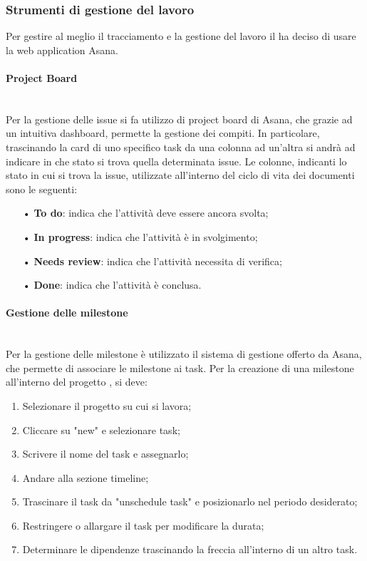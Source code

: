     \subsubsection{Strumenti di gestione del lavoro}\mbox{}
    Per gestire al meglio il tracciamento e la gestione del lavoro il \Gruppo \space ha deciso di usare la web application Asana. 

    \paragraph{Project Board}\mbox{}\\
    \label{sec:projectboard}
    Per la gestione delle {issue} si fa utilizzo di {project board} di Asana, che grazie ad un intuitiva dashboard, permette
    la gestione dei compiti. In particolare, trascinando la {card} di uno specifico task da una colonna ad un'altra si andrà ad 
    indicare in che stato si trova quella determinata issue.
    Le colonne, indicanti lo stato in cui si trova la issue, utilizzate all'interno del ciclo di vita dei 
    documenti sono le seguenti:
    \begin{itemize}
    \item[•] \textbf{To do}: indica che l'attività deve essere ancora svolta;
    \item[•] \textbf{In progress}: indica che l'attività è in svolgimento;
    \item[•] \textbf{Needs review}: indica che l'attività necessita di verifica;
    \item[•] \textbf{Done}: indica che l'attività è conclusa.
    \end{itemize}

    \paragraph{Gestione delle milestone}\mbox{}\\
    Per la gestione delle {milestone} è utilizzato il sistema di gestione offerto da Asana, che permette di associare le 
    milestone ai task.
    Per la creazione di una milestone all'interno del progetto \NomeProgetto, si deve:
    \begin{enumerate}
    \item Selezionare il progetto su cui si lavora;
    \item Cliccare su "new" e selezionare task;
    \item Scrivere il nome del task e assegnarlo;
    \item Andare alla sezione timeline;
    \item Trascinare il task da "unschedule task" e posizionarlo nel periodo desiderato;
    \item Restringere o allargare il task per modificare la durata; 
    \item Determinare le dipendenze trascinando la freccia all'interno di un altro task.
    \end{enumerate}

